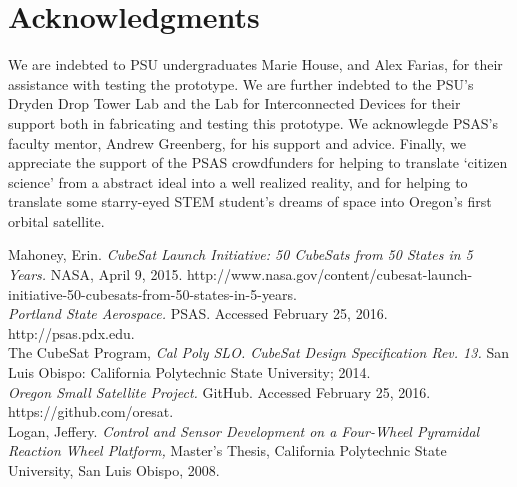\documentclass[]{aiaa-tc}%
\begin{document}
\section{Acknowledgments}
We are indebted to PSU undergraduates Marie House, and Alex Farias, for their assistance with testing the prototype. We are further indebted to the PSU's Dryden Drop Tower Lab and the Lab for Interconnected Devices for their support both in fabricating and testing this prototype. We acknowlegde PSAS's faculty mentor, Andrew Greenberg, for his support and advice. Finally, we appreciate the support of the PSAS crowdfunders for helping to translate `citizen science' from a abstract ideal into a well realized reality, and for helping to translate some starry-eyed STEM student's dreams of space into Oregon's first orbital satellite.

\begin{thebibliography}{9}%

Mahoney, Erin. {\it CubeSat Launch Initiative: 50 CubeSats from 50 States in 5 Years.} NASA, April 9, 2015. http://www.nasa.gov/content/cubesat-launch-initiative-50-cubesats-from-50-states-in-5-years.\\

{\it Portland State Aerospace.} PSAS. Accessed February 25, 2016. http://psas.pdx.edu.\\

The CubeSat Program, {\it Cal Poly SLO. CubeSat Design Specification Rev. 13.} San Luis
Obispo: California Polytechnic State University; 2014.\\

{\it Oregon Small Satellite Project.} GitHub. Accessed February 25, 2016. https://github.com/oresat.\\

Logan, Jeffery. {\it Control and Sensor Development on a Four-Wheel Pyramidal Reaction Wheel Platform,} Master’s Thesis, California Polytechnic State University, San Luis Obispo, 2008.\\


\end{thebibliography}
\end{document}
